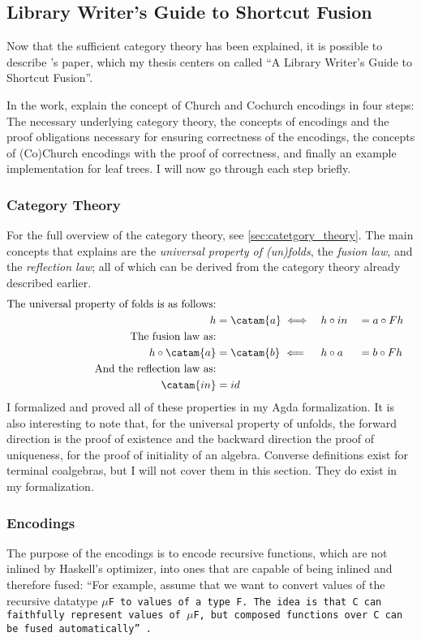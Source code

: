 
\subsection{Library Writer's Guide to Shortcut Fusion}
Now that the sufficient category theory has been explained, it is possible to describe \cite{Harper2011}'s paper, which my thesis centers on called ``A Library Writer's Guide to Shortcut Fusion''.

In the work, \cite{Harper2011} explain the concept of Church and Cochurch encodings in four steps:
The necessary underlying category theory, the concepts of encodings and the proof obligations necessary for ensuring correctness of the encodings, the concepts of (Co)Church encodings with the proof of correctness, and finally an example implementation for leaf trees.
I will now go through each step briefly.

\subsubsection{Category Theory}
For the full overview of the category theory, see \autoref{sec:catetgory_theory}.
The main concepts that \cite{Harper2011} explains are the \textit{universal property of (un)folds}, the \textit{fusion law}, and the \textit{reflection law}; all of which can be derived from the category theory already described earlier.
\begin{alignat*}{3}
\text{The universal property of folds is as follows:} \\
h &= \catam{a} \iff && h \circ in &&= a \circ F h \\
\text{The fusion law as:} \\
h \circ \catam{a} &= \catam{b}~\Longleftarrow && h \circ a &&= b \circ F h \\
\text{And the reflection law as:} \\
\catam{in} &= id
\end{alignat*}
I formalized and proved all of these properties in my Agda formalization.
It is also interesting to note that, for the universal property of unfolds, the forward direction is the proof of existence and the backward direction the proof of uniqueness, for the proof of initiality of an algebra.
Converse definitions exist for terminal coalgebras, but I will not cover them in this section.
They do exist in my formalization.

\subsubsection{Encodings}
The purpose of the encodings is to encode recursive functions, which are not inlined by Haskell's optimizer, into ones that are capable of being inlined and therefore fused:
``For example, assume that we want to convert values of the recursive datatype \tt{$\mu$F} to values of a type \tt{F}.  The idea is that \tt{C} can faithfully represent values of \tt{$\mu$F}, but composed functions over \tt{C} can be fused automatically'' \citep{Harper2011}.

